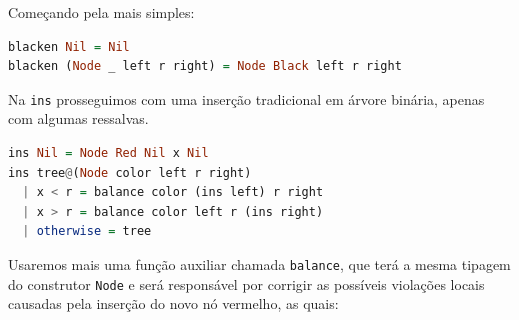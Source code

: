 Começando pela mais simples:

\begin{lstlisting}[language=haskell, caption={Função auxiliar 1}]
blacken Nil = Nil
blacken (Node _ left r right) = Node Black left r right
\end{lstlisting}
\FloatBarrier

Na \texttt{ins} prosseguimos com uma inserção tradicional em árvore binária, apenas com algumas ressalvas.

\begin{lstlisting}[language=haskell,caption={Função auxiliar 2}]
ins Nil = Node Red Nil x Nil                 
ins tree@(Node color left r right)           
  | x < r = balance color (ins left) r right 
  | x > r = balance color left r (ins right) 
  | otherwise = tree                         
\end{lstlisting}
\FloatBarrier

Usaremos mais uma função auxiliar chamada \texttt{balance}, que terá a mesma tipagem do construtor \texttt{Node} e será responsável por corrigir as possíveis violações locais causadas pela inserção do novo nó vermelho, as quais:

